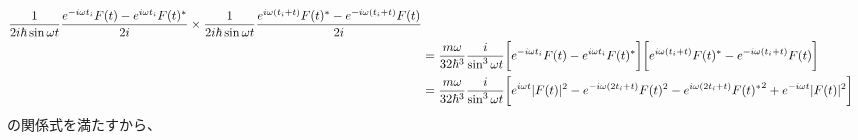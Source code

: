 \begin{subequations}
\begin{align}
    \dfrac{1}{2 i \hbar \sin \omega t}
    \dfrac{
        e^{- i \omega t_i} F(t)
    -
        e^{i \omega t_i} F(t)^*
    }{2 i}
\times
    \dfrac{1}{2 i \hbar \sin \omega t}
    \dfrac{
        e^{i \omega (t_i + t)} F(t)^*
    -
        e^{- i \omega (t_i + t)} F(t)
    }{2 i}
\notag\\&
    =
    \dfrac{m \omega}{32 \hbar^3}
    \dfrac{ i }{\sin^3 \omega t}
    \bigg[
        e^{- i \omega t_i} F(t)
    -
        e^{i \omega t_i} F(t)^*
    \bigg]
    \bigg[
        e^{i \omega (t_i + t)} F(t)^*
    -
        e^{- i \omega (t_i + t)} F(t)
    \bigg]
\notag\\&
    =
    \dfrac{m \omega}{32 \hbar^3}
    \dfrac{ i }{\sin^3 \omega t}
    \bigg[
        e^{i \omega t}
        | F(t) |^2
    -
        e^{- i \omega (2 t_i + t)} F(t)^2
    -
        e^{i \omega (2 t_i + t)} {F(t)^*}^2
    +
        e^{- i \omega t}
        | F(t) |^2
    \bigg]
\end{align}
\end{subequations}
の関係式を満たすから、
